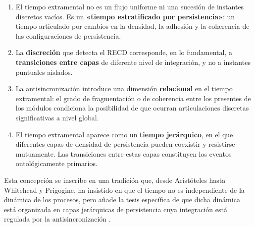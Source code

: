 \begin{enumerate}
    \item El tiempo extramental no es un flujo uniforme ni una sucesión de instantes discretos vacíos. Es un \textbf{«tiempo estratificado por persistencia»}: un tiempo articulado por cambios en la densidad, la adhesión y la coherencia de las configuraciones de persistencia.
    
    \item La \textbf{discreción} que detecta el RECD corresponde, en lo fundamental, a \textbf{transiciones entre capas} de diferente nivel de integración, y no a instantes puntuales aislados.
    
    \item La antisincronización introduce una dimensión \textbf{relacional} en el tiempo extramental: el grado de fragmentación o de coherencia entre los presentes de los módulos condiciona la posibilidad de que ocurran articulaciones discretas significativas a nivel global.
    
    \item El tiempo extramental aparece como un \textbf{tiempo jerárquico}, en el que diferentes capas de densidad de persistencia pueden coexistir y resistirse mutuamente. Las transiciones entre estas capas constituyen los eventos ontológicamente primarios.
\end{enumerate}

Esta concepción se inscribe en una tradición que, desde Aristóteles hasta Whitehead y Prigogine, ha insistido en que el tiempo no es independiente de la dinámica de los procesos, pero añade la tesis específica de que dicha dinámica está organizada en capas jerárquicas de persistencia cuya integración está regulada por la antisincronización \citep{padilla_polo_dialogue_2026}.
